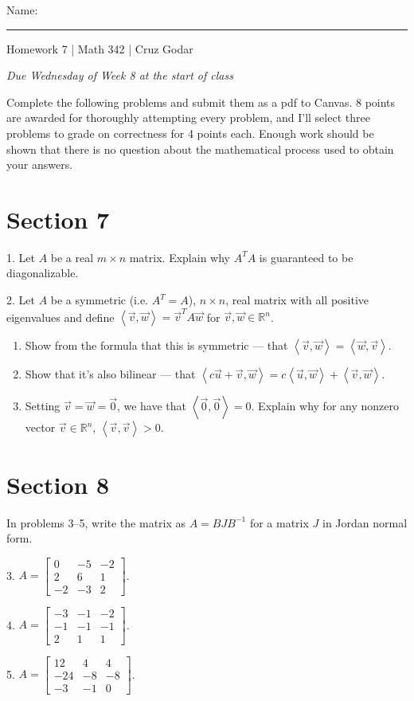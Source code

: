 \documentclass{article}
\begin{document}
\Large Name: \rule{2in}{0.15mm} \hfill Homework 7 | Math 342 | Cruz Godar \vspace{4pt}  \normalsize

\textit{Due Wednesday of Week 8 at the start of class}

Complete the following problems and submit them as a pdf to Canvas. 8 points are awarded for thoroughly attempting every problem, and I'll select three problems to grade on correctness for 4 points each. Enough work should be shown that there is no question about the mathematical process used to obtain your answers.

\section{Section 7}

1. Let $A$ be a real $m \times n$ matrix. Explain why $A^T\!A$ is guaranteed to be diagonalizable.

2. Let $A$ be a symmetric (i.e. $A^T = A$), $n \times n$, real matrix with all positive eigenvalues and define $\left< \vec{v}, \vec{w} \right> = \vec{v}^T A \vec{w}$ for $\vec{v}, \vec{w} \in \mathbb{R}^n$.

\begin{enumerate}

	\item Show from the formula that this is symmetric --- that $\left< \vec{v}, \vec{w} \right> = \left< \vec{w}, \vec{v} \right>$.

	\item Show that it's also bilinear --- that $\left< c\vec{u} + \vec{v}, \vec{w} \right> = c\left< \vec{u}, \vec{w} \right> + \left< \vec{v}, \vec{w} \right>$.

	\item Setting $\vec{v} = \vec{w} = \vec{0}$, we have that $\left< \vec{0}, \vec{0} \right> = 0$. Explain why for any nonzero vector $\vec{v} \in \mathbb{R}^n$, $\left< \vec{v}, \vec{v} \right> > 0$.

\end{enumerate}

\section{Section 8}

In problems 3--5, write the matrix as $A = BJB^{-1}$ for a matrix $J$ in Jordan normal form.

3. $A = \left[\begin{array}{ccc} 0& -5& -2 \\ 2& 6& 1 \\ -2& -3& 2 \end{array}\right]$.

4. $A = \left[\begin{array}{ccc} -3& -1& -2 \\ -1& -1& -1 \\ 2& 1& 1 \end{array}\right]$.

5. $A = \left[\begin{array}{ccc} 12& 4& 4 \\ -24& -8& -8 \\ -3& -1& 0 \end{array}\right]$.
\end{document}
